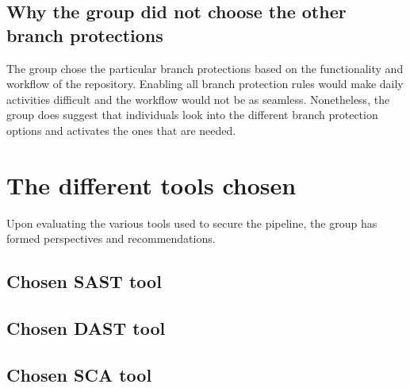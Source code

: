 \subsection{Why the group did not choose the other branch protections}%
The group chose the particular branch protections based on the functionality and workflow of the repository. Enabling all branch protection rules would make daily activities difficult and the workflow would not be as seamless. Nonetheless, the group does suggest that individuals look into the different branch protection options and activates the ones that are needed. 



\section{The different tools chosen}
Upon evaluating the various tools used to secure the pipeline, the group has formed perspectives and recommendations. 

\subsection{Chosen SAST tool}

\subsection{Chosen DAST tool}

\subsection{Chosen SCA tool}







